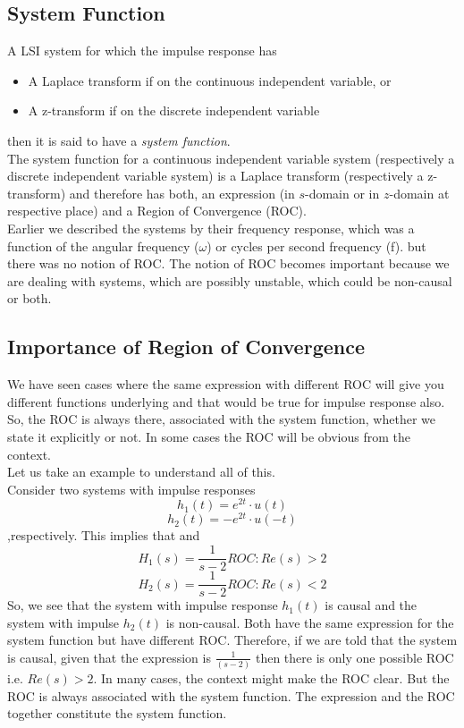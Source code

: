 {\subsection{System Function}
A LSI system for which the impulse response has
\begin{itemize}
\item A Laplace transform if on the continuous independent variable, or
\item A z-transform if on the discrete independent variable
\end{itemize}
then it is said to have a \emph{system function}.\\
The system function for a continuous independent variable system (respectively a discrete independent variable system) is a Laplace transform (respectively a z-transform) and therefore has both, an expression (in $s$-domain or in $z$-domain at respective place) and a Region of Convergence (ROC).\\
Earlier we described the systems by their frequency response, which was a function of the angular frequency ($\omega$) or cycles per second frequency (f). but there was no notion of ROC. The notion of ROC becomes important because we are dealing with systems, which are possibly unstable, which could be non-causal or both.
\subsection{Importance of Region of Convergence}
We have seen cases where the same expression with different ROC will give you different functions underlying and that would be true for impulse response also.\\
So, the ROC is always there, associated with the system function, whether we state it explicitly or not. In some cases the ROC will be obvious from the context.\\
Let us take an example to understand all of this. \\
Consider two systems with impulse responses 
\[
h_1(t) = e^{2t} \cdot u(t)
\]
\[
h_2(t) = -e^{2t} \cdot u(-t)
\]
,respectively. This implies that and
\[
H_1(s) = \frac{1}{s-2}  ROC : Re(s) > 2
\]
\[
H_2(s) = \frac{1}{s-2}  ROC : Re(s) < 2
\]
So, we see that the system with impulse response $h_1 (t)$ is causal and the system with impulse $h_2 (t)$ is non-causal. Both have the same expression for the system function but have different ROC.
Therefore, if we are told that the system is causal, given that the expression is $ \frac{1}{(s-2)}$ then there is only one possible ROC i.e. $Re(s)>2$.
In many cases, the context might make the ROC clear. But the ROC is always associated with the system function. The expression and the ROC together constitute the system function.
}
